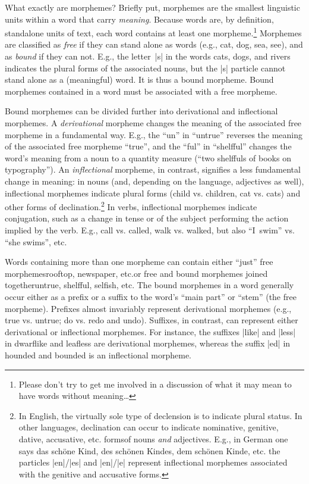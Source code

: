 \documentclass[11pt]{article}
\begin{document}
What exactly are morphemes? Briefly put, morphemes are the smallest linguistic units within a word that carry \emph{meaning}. Because words are, by definition, standalone units of text, each word contains at least one morpheme.\footnote{Please don't try to get me involved in a discussion of what it may mean to have words without meaning\dots} Morphemes are classified as \emph{free} if they can stand alone as words (e.g., cat, dog, sea, see), and as \emph{bound} if they can not. E.g., the letter~|s| in the words cats, dogs, and rivers indicates the plural forms of the associated nouns, but the |s| particle cannot stand alone as a (meaningful) word. It is thus a bound morpheme. Bound morphemes contained in a word must be associated with a free morpheme.

Bound morphemes can be divided further into derivational and inflectional morphemes. A \emph{derivational} morpheme changes the meaning of the associated free morpheme in a fundamental way. E.g., the \enquote{un} in \enquote{untrue} reverses the meaning of the associated free morpheme \enquote{true}, and the \enquote{ful} in \enquote{shelfful} changes the word's meaning from a noun to a quantity measure (\enquote{two shelffuls of books on typography}). An \emph{inflectional} morpheme, in contrast, signifies a less fundamental change in meaning: in nouns (and, depending on the language, adjectives as well), inflectional morphemes indicate plural forms (child vs. children, cat vs. cats) and other forms of declination.\footnote{In English, the virtually sole type of declension is to indicate plural status. In other languages, declination can occur to indicate nominative, genitive, dative, accusative, etc. forms\textemdash of nouns \emph{and} adjectives. E.g., in German one says das schöne Kind, des schönen Kindes, dem schönen Kinde, etc. the particles |en|/|es| and |en|/|e| represent inflectional morphemes associated with the genitive and accusative forms.} In verbs, inflectional morphemes indicate conjugation, such as a change in tense or of the subject performing the action implied by the verb. E.g., call vs. called, walk vs. walked, but also \enquote{I~swim} vs. \enquote{she swims}, etc. 

Words containing more than one morpheme can contain either \enquote{just} free morphemes\textemdash rooftop, newspaper, etc.\textemdash or free and bound morphemes joined together\textemdash untrue, shelfful, sel\mbox{fi}sh, etc. The bound morphemes in a word generally occur either as a prefix or a suffix to the word's \enquote{main part} or \enquote{stem} (the free morpheme). Prefixes almost invariably represent derivational morphemes (e.g., true vs. untrue; do vs. redo and undo). Suffixes, in contrast, can represent either derivational or inflectional morphemes. For instance, the suffixes |like| and |less| in dwarflike and leafless are derivational morphemes, whereas the suffix |ed| in hounded and bounded is an inflectional morpheme. 
\end{document}
